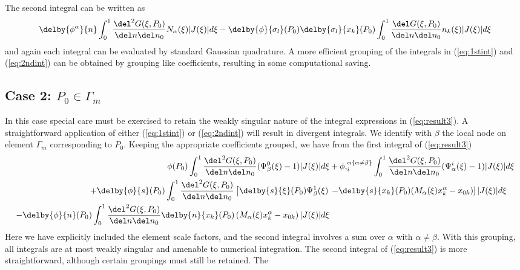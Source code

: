 The second integral can be written as
\begin{equation}
 \delby{\phi^{\alpha}}{n}\int_{0}^{1}\frac{\del^{2}G(\xi,P_{0})}
  {\del n\del n_{0}}N_{\alpha}(\xi)|J(\xi)|d\xi - 
  \delby{\phi}{\sigma_{l}}(P_{0})\delby{\sigma_{l}}{x_{k}}(P_{0})
   \int_{0}^{1}\frac{\del G(\xi,P_{0})}{\del n\del n_{0}}
   n_{k}(\xi)|J(\xi)|d\xi
 \label{eq:2ndint}
\end{equation}
and again each integral can be evaluated by standard Gaussian quadrature.  A
more efficient grouping of the integrals in (\ref{eq:1stint}) and
(\ref{eq:2ndint}) can be obtained by grouping like coefficients, resulting in
some computational saving.

\subsection*{Case 2:  $P_{0}\in \Gamma_{m}$} 
In this case special care must be exercised to retain the weakly singular
nature of the integral expressions in (\ref{eq:result3}).  A straightforward
application of either (\ref{eq:1stint}) or (\ref{eq:2ndint}) will result in
divergent integrals.  We identify with $\beta$ the local node on element
$\Gamma_{m}$ corresponding to $P_{0}$.  Keeping the appropriate coefficients
grouped, we have from the first integral of (\ref{eq:result3})
\begin{eqnarray}
 \phi(P_{0})\int_{0}^{1}\frac{\del^{2}G(\xi,P_{0})}
  {\del n\del n_{0}}(\Psi_{\beta}^{0}(\xi)-1)|J(\xi)|d\xi & + 
  \phi ,_{i}^{\alpha\{\alpha\neq\beta\}}\int_{0}^{1}
  \frac{\del^{2}G(\xi,P_{0})}
  {\del n\del n_{0}}(\Psi_{\alpha}^{i}(\xi)-1)|J(\xi)|d\xi\nonumber\\
 +\delby{\phi}{s}(P_{0})\int_{0}^{1}\frac{\del^{2}G(\xi,P_{0})}
  {\del n\del n_{0}}\left[\delby{s}{\xi}(P_{0})\Psi_{\beta}^{1}(\xi)\right.
 & \left.- \delby{s}{x_{k}}(P_{0})(M_{\alpha}(\xi)x_{k}^{\alpha}-x_{0k})\right]
 |J(\xi)|d\xi\nonumber\\
 -\delby{\phi}{n}(P_{0})\int_{0}^{1}\frac{\del^{2}G(\xi,P_{0})}
  {\del n\del n_{0}}\delby{n}{x_{k}}(P_{0})
  \left(M_{\alpha}(\xi)x_{k}^{\alpha}-x_{0k}\right)|J(\xi)|d\xi
 \label{eq:from1stint}
\end{eqnarray}
Here we have explicitly included the element scale factors, and the second
integral involves a sum over $\alpha$ with $\alpha\neq\beta$.  With this
grouping, all integrals are at most weakly singular and amenable to numerical
integration.  The second integral of (\ref{eq:result3}) is more
straightforward, although certain groupings must still be retained.  The
